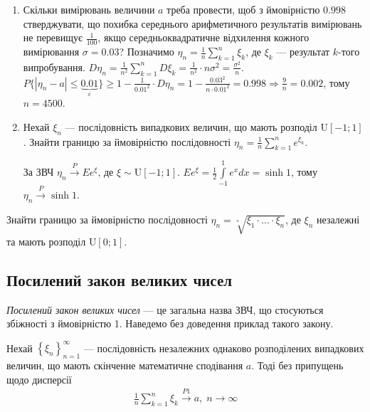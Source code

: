 \begin{example}
    \begin{enumerate}
        \item Скільки вимірювань величини $a$ треба провести, щоб з ймовірністю $0.998$ стверджувати, що похибка середнього арифметичного результатів
        вимірювань не перевищує $\frac{1}{100}$, якщо середньоквадратичне відхилення кожного вимірювання $\sigma = 0.03$?
        Позначимо $\eta_n = \frac{1}{n}\sum\limits_{k=1}^n \xi_k$, де $\xi_k$ --- результат $k$-того випробування.
        $D\eta_n = \frac{1}{n^2} \sum\limits_{k=1}^n D\xi_k = \frac{1}{n^2} \cdot n\sigma^2 = \frac{\sigma^2}{n}$.
        $P\{\left|\eta_n - a \right| \leq \underbrace{0.01}_{\varepsilon}\} \geq 1 - \frac{1}{0.01^2}\cdot D\eta_n =
        1 - \frac{0.03^2}{n\cdot 0.01^2} = 0.998 \Rightarrow \frac{9}{n} = 0.002$, тому $n = 4500$.
        \item Нехай $\xi_n$ --- послідовність випадкових величин, що мають розподіл $\mathrm{U}[-1; 1]$. Знайти границю за
        ймовірністю послідовності $\eta_n = \frac{1}{n}\sum\limits_{k=1}^n e^{\xi_k}$.

        За ЗВЧ $\eta_n \overset{P}{\longrightarrow} E e^\xi$, де $\xi \sim \mathrm{U}[-1; 1]$. 
        $E e^\xi = \frac{1}{2}\int\limits_{-1}^1 e^x dx = \sinh{1}$, тому $\eta_n \overset{P}{\longrightarrow} \sinh{1}$.
    \end{enumerate}
\end{example}
\begin{exercise}
    Знайти границю за ймовірністю послідовності $\eta_n = \sqrt[^n]{\xi_1 \cdot ... \cdot \xi_n}$, де $\xi_n$ незалежні та мають розподіл $\mathrm{U}[0;1]$.
\end{exercise}


\subsection{Посилений закон великих чисел}
\emph{Посилений закон великих чисел} --- це загальна назва ЗВЧ, що стосуються збіжності з ймовірністю 1. Наведемо без доведення приклад такого закону.
\begin{theorem*}
    Нехай $\left\{ \xi_n\right\}_{n=1}^{\infty}$ --- послідовність незалежних однаково розподілених випадкових величин, що мають скінченне
    математичне сподівання $a$. Тоді без припущень щодо дисперсії
    \begin{gather}\label{Kolm_theor}
        \frac{1}{n}\sum\limits_{k=1}^n \xi_k \overset{P1}{\longrightarrow} a, \; n \to \infty
    \end{gather}
\end{theorem*}

